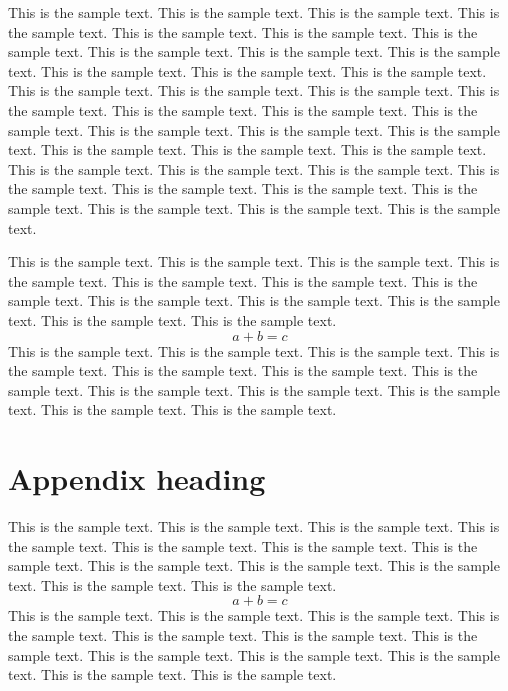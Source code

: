 \documentclass[preprint]{ptephy_v1}%
\begin{document}
This is the sample text. This is the sample text. This is the sample text. This is the sample text.
This is the sample text. This is the sample text. This is the sample text. This is the sample text.
This is the sample text. This is the sample text. This is the sample text. This is the sample text.
This is the sample text. This is the sample text. This is the sample text. This is the sample text.
This is the sample text. This is the sample text. This is the sample text. This is the sample text.
This is the sample text. This is the sample text. This is the sample text. This is the sample text.
This is the sample text. This is the sample text. This is the sample text. This is the sample text.
This is the sample text. This is the sample text. This is the sample text. This is the sample text.
This is the sample text. This is the sample text. This is the sample text. This is the sample text.


This is the sample text. This is the sample text. This is the sample text. This is the sample text.
This is the sample text. This is the sample text. This is the sample text. This is the sample text.
This is the sample text. This is the sample text. This is the sample text. This is the sample text.
\begin{equation}
a + b = c
\end{equation}
This is the sample text. This is the sample text. This is the sample text. This is the sample text.
This is the sample text. This is the sample text. This is the sample text. This is the sample text.
This is the sample text. This is the sample text. This is the sample text. This is the sample text.

\section{Appendix heading}
This is the sample text. This is the sample text. This is the sample text. This is the sample text.
This is the sample text. This is the sample text. This is the sample text. This is the sample text.
This is the sample text. This is the sample text. This is the sample text. This is the sample text.
\begin{equation}
a + b = c
\end{equation}
This is the sample text. This is the sample text. This is the sample text. This is the sample text.
This is the sample text. This is the sample text. This is the sample text. This is the sample text.
This is the sample text. This is the sample text. This is the sample text. This is the sample text.
\end{document}
